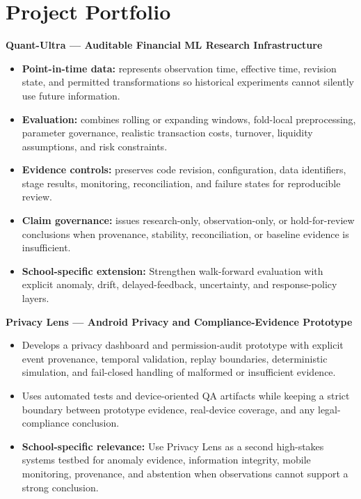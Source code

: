 \documentclass[11pt]{article}
\begin{document}
\section*{Project Portfolio}
\textbf{Quant-Ultra --- Auditable Financial ML Research Infrastructure}
\begin{itemize}
\item \textbf{Point-in-time data:} represents observation time, effective time, revision state, and permitted transformations so historical experiments cannot silently use future information.
\item \textbf{Evaluation:} combines rolling or expanding windows, fold-local preprocessing, parameter governance, realistic transaction costs, turnover, liquidity assumptions, and risk constraints.
\item \textbf{Evidence controls:} preserves code revision, configuration, data identifiers, stage results, monitoring, reconciliation, and failure states for reproducible review.
\item \textbf{Claim governance:} issues research-only, observation-only, or hold-for-review conclusions when provenance, stability, reconciliation, or baseline evidence is insufficient.
\item \textbf{School-specific extension:} Strengthen walk-forward evaluation with explicit anomaly, drift, delayed-feedback, uncertainty, and response-policy layers.
\end{itemize}

\textbf{Privacy Lens --- Android Privacy and Compliance-Evidence Prototype}
\begin{itemize}
\item Develops a privacy dashboard and permission-audit prototype with explicit event provenance, temporal validation, replay boundaries, deterministic simulation, and fail-closed handling of malformed or insufficient evidence.
\item Uses automated tests and device-oriented QA artifacts while keeping a strict boundary between prototype evidence, real-device coverage, and any legal-compliance conclusion.
\item \textbf{School-specific relevance:} Use Privacy Lens as a second high-stakes systems testbed for anomaly evidence, information integrity, mobile monitoring, provenance, and abstention when observations cannot support a strong conclusion.
\end{itemize}
\end{document}
